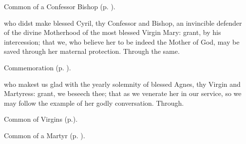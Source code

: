 \vspace{-0.25\baselineskip}


\begin{rubric}
	Common of a Confessor Bishop (p. \pageref{CommonConfessorBishop}).
\end{rubric}

{} who didst make blessed Cyril, thy Confessor and Bishop, an invincible defender of the divine Motherhood of the most blessed Virgin Mary: grant, by his intercession; that we, who believe her to be indeed the Mother of God, may be saved through her maternal protection. Through the same.

\begin{rubric}
    Commemoration  (p. \pageref{AgnesCollectII}).
\end{rubric}


\vspace{-0.25\baselineskip}


\memorialCollect\label{AgnesCollectII}
 who makest us glad with the yearly solemnity of blessed Agnes, thy Virgin and Martyress: grant, we beseech thee; that as we venerate her in our service, so we may follow the example of her godly conversation. Through.


\vspace{-0.25\baselineskip}


\begin{rubric}
	Common of Virgins (p.\pageref{VirginMartyressCollect}).
\end{rubric}


\vspace{-0.25\baselineskip}


\begin{rubric}
	Common of a Martyr (p. \pageref{CommonMartyr}).
\end{rubric}

